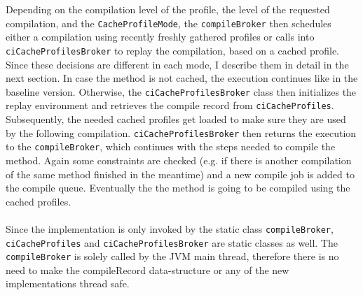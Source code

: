 Depending on the compilation level of the profile, the level of the requested compilation, and the \texttt{CacheProfileMode}, the \texttt{compileBroker} then schedules either a compilation using recently freshly gathered profiles or calls into \texttt{ciCacheProfilesBroker} to replay the compilation, based on a cached profile. Since these decisions are different in each mode, I describe them in detail in the next section.
In case the method is not cached, the execution continues like in the baseline version.
Otherwise, the \texttt{ciCacheProfilesBroker} class then initializes the replay environment and retrieves the compile record from \texttt{ciCacheProfiles}. Subsequently, the needed cached profiles get loaded to make sure they are used by the following compilation. \texttt{ciCacheProfilesBroker} then returns the execution to the \texttt{compileBroker}, which continues with the steps needed to compile the method. Again some constraints are checked (e.g. if there is another compilation of the same method finished in the meantime) and a new compile job is added to the compile queue. Eventually the the method is going to be compiled using the cached profiles.
\\\\
Since the implementation is only invoked by the static class \texttt{compileBroker}, \texttt{ciCacheProfiles} and \texttt{ciCacheProfilesBroker} are static classes as well. The \texttt{compileBroker} is solely called by the JVM main thread, therefore there is no need to make the compileRecord data-structure or any of the new implementations thread safe. 

